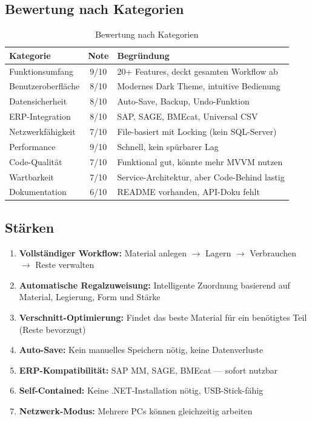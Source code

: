 \documentclass[a4paper,12pt]{article}
\begin{document}
\subsection{Bewertung nach Kategorien}

\begin{table}[h]
\centering
\begin{tabularx}{\textwidth}{l c X}
\toprule
\textbf{Kategorie} & \textbf{Note} & \textbf{Begründung} \\
\midrule
Funktionsumfang & 9/10 & 20+ Features, deckt gesamten Workflow ab \\
Benutzeroberfläche & 8/10 & Modernes Dark Theme, intuitive Bedienung \\
Datensicherheit & 8/10 & Auto-Save, Backup, Undo-Funktion \\
ERP-Integration & 8/10 & SAP, SAGE, BMEcat, Universal CSV \\
Netzwerkfähigkeit & 7/10 & File-basiert mit Locking (kein SQL-Server) \\
Performance & 9/10 & Schnell, kein spürbarer Lag \\
Code-Qualität & 7/10 & Funktional gut, könnte mehr MVVM nutzen \\
Wartbarkeit & 7/10 & Service-Architektur, aber Code-Behind lastig \\
Dokumentation & 6/10 & README vorhanden, API-Doku fehlt \\
\bottomrule
\end{tabularx}
\caption{Bewertung nach Kategorien}
\end{table}

\subsection{Stärken}

\begin{enumerate}
    \item \textbf{Vollständiger Workflow:} Material anlegen $\rightarrow$ Lagern $\rightarrow$ Verbrauchen $\rightarrow$ Reste verwalten
    \item \textbf{Automatische Regalzuweisung:} Intelligente Zuordnung basierend auf Material, Legierung, Form und Stärke
    \item \textbf{Verschnitt-Optimierung:} Findet das beste Material für ein benötigtes Teil (Reste bevorzugt)
    \item \textbf{Auto-Save:} Kein manuelles Speichern nötig, keine Datenverluste
    \item \textbf{ERP-Kompatibilität:} SAP MM, SAGE, BMEcat — sofort nutzbar
    \item \textbf{Self-Contained:} Keine .NET-Installation nötig, USB-Stick-fähig
    \item \textbf{Netzwerk-Modus:} Mehrere PCs können gleichzeitig arbeiten
\end{enumerate}
\end{document}
